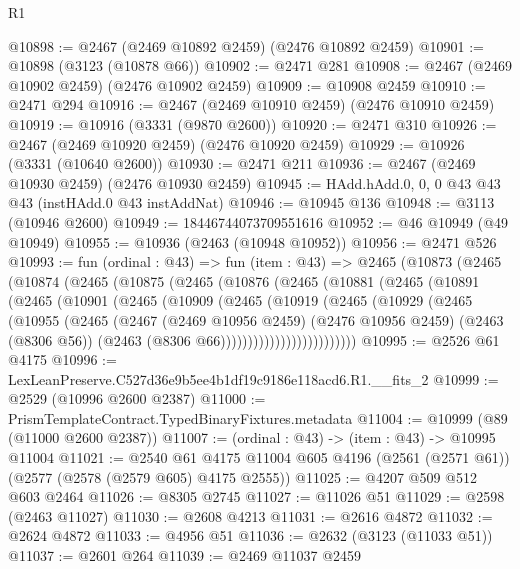 \begin{lexlean}{R1}
\begin{coremodule}
@10898 := @2467 (@2469 @10892 @2459) (@2476 @10892 @2459)
@10901 := @10898 (@3123 (@10878 @66))
@10902 := @2471 @281
@10908 := @2467 (@2469 @10902 @2459) (@2476 @10902 @2459)
@10909 := @10908 @2459
@10910 := @2471 @294
@10916 := @2467 (@2469 @10910 @2459) (@2476 @10910 @2459)
@10919 := @10916 (@3331 (@9870 @2600))
@10920 := @2471 @310
@10926 := @2467 (@2469 @10920 @2459) (@2476 @10920 @2459)
@10929 := @10926 (@3331 (@10640 @2600))
@10930 := @2471 @211
@10936 := @2467 (@2469 @10930 @2459) (@2476 @10930 @2459)
@10945 := HAdd.hAdd.{0, 0, 0} @43 @43 @43 (instHAdd.{0} @43 instAddNat)
@10946 := @10945 @136
@10948 := @3113 (@10946 @2600)
@10949 := 18446744073709551616
@10952 := @46 @10949 (@49 @10949)
@10955 := @10936 (@2463 (@10948 @10952))
@10956 := @2471 @526
@10993 := fun (ordinal : @43) =>
  fun (item : @43) =>
  @2465
    (@10873
      (@2465
        (@10874
          (@2465
            (@10875
              (@2465
                (@10876
                  (@2465
                    (@10881
                      (@2465
                        (@10891
                          (@2465
                            (@10901
                              (@2465
                                (@10909
                                  (@2465
                                    (@10919
                                      (@2465
                                        (@10929
                                          (@2465
                                            (@10955
                                              (@2465
                                                (@2467
                                                  (@2469 @10956 @2459)
                                                  (@2476 @10956 @2459)
                                                  (@2463 (@8306 @56))
                                                  (@2463 (@8306 @66)))))))))))))))))))))))))
@10995 := @2526 @61 @4175
@10996 := LexLeanPreserve.C527d36e9b5ee4b1df19c9186e118acd6.R1.__fits_2
@10999 := @2529 (@10996 @2600 @2387)
@11000 := PrismTemplateContract.TypedBinaryFixtures.metadata
@11004 := @10999 (@89 (@11000 @2600 @2387))
@11007 := (ordinal : @43) -> (item : @43) -> @10995 @11004
@11021 := @2540
    @61
    @4175
    @11004
    @605
    @4196
    (@2561 (@2571 @61))
    (@2577 (@2578 (@2579 @605) @4175 @2555))
@11025 := @4207 @509 @512 @603 @2464
@11026 := @8305 @2745
@11027 := @11026 @51
@11029 := @2598 (@2463 @11027)
@11030 := @2608 @4213
@11031 := @2616 @4872
@11032 := @2624 @4872
@11033 := @4956 @51
@11036 := @2632 (@3123 (@11033 @51))
@11037 := @2601 @264
@11039 := @2469 @11037 @2459

\end{coremodule}
\end{lexlean}
